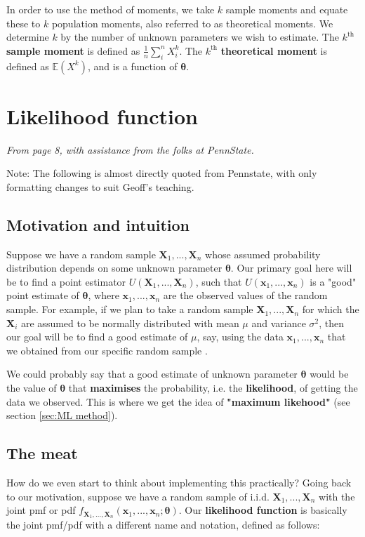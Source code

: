 In order to use the method of moments, we take \(k\) sample moments and equate these to \(k\) population moments, also referred to as theoretical moments. 
We determine \(k\) by the number of unknown parameters we wish to estimate. 
The \(k^{\text{th}}\) \textbf{sample moment} is defined as \(\frac{1}{n}\sum_{i}^{n}X_i^k\). 
The \(k^{\text{th}}\) \textbf{theoretical moment} is defined as \(\mathbb{E}(X^k)\), and is a function of \(\bm{\theta}\).





\section{Likelihood function}\label{sec:likelihood func}

\textit{From page 8, with assistance from the folks at PennState.\autocite{penn415}}

Note: The following is almost directly quoted from Pennstate, with only formatting changes to suit Geoff's teaching.

\medskip

\subsection{Motivation and intuition}
Suppose we have a random sample \(\bm{X}_1,...,\bm{X}_n\) whose assumed probability distribution depends on some unknown parameter \(\bm{\theta}\). 
Our primary goal here will be to find a point estimator \(U(\bm{X}_1,...,\bm{X}_n)\), such that \(U(\bm{x}_1,...,\bm{x}_n)\) is a "good" point estimate of \(\bm{\theta}\), where \(\bm{x}_1,...,\bm{x}_n\) are the observed values of the random sample. 
For example, if we plan to take a random sample \(\bm{X}_1,...,\bm{X}_n\) for which the \(\bm{X}_i\) are assumed to be normally distributed with mean \(\mu\) and variance \(\sigma^2\), then our goal will be to find a good estimate of \(\mu\), say, using the data \(\bm{x}_1,...,\bm{x}_n\) that we obtained from our specific random sample \autocite{penn415}.

\bigskip

We could probably say that a good estimate of unknown parameter \(\bm{\theta}\) would be the value of \(\bm{\theta}\) that \textbf{maximises} the probability, i.e. the \textbf{likelihood}, of getting the data we observed. 
This is where we get the idea of \textbf{"maximum likehood"} (see section \ref{sec:ML method}). 

\subsection{The meat}
How do we even start to think about implementing this practically?
Going back to our motivation, suppose we have a random sample of i.i.d. \(\bm{X}_1,...,\bm{X}_n\) with the joint pmf or pdf \(f_{\bm{X}_1,...,\bm{X}_n}(\bm{x}_1,...,\bm{x}_n;\bm{\theta})\). 
Our \textbf{likelihood function} is basically the joint pmf/pdf with a different name and notation, defined as follows:

